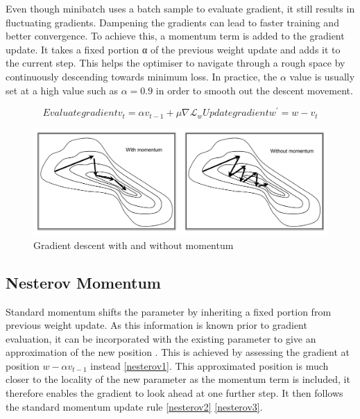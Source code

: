 \documentclass[11pt]{article} %
\theoremstyle{plain}
\theoremstyle{definition}
\begin{document}
\begin{appendices}
	Even though minibatch uses a batch sample to evaluate gradient, it still results in fluctuating gradients. Dampening the gradients can lead to faster training and better convergence. To achieve this, a momentum term is added to the gradient update. It takes a fixed portion α of the previous weight update and adds it to the current step. This helps the optimiser to navigate through a rough space by continuously descending towards minimum loss. In practice, the \(\alpha\) value is usually set at a high value such as \(\alpha=0.9\) in order to smooth out the descent movement.
	
	
	\begin{subequations} 
		
		Evaluate gradient
		\begin{equation}
		\label{momentum1}
		v_t=\alpha v_{t-1}+\mu \nabla \mathcal{L}_w
		\end{equation}
		
		Update gradient
		\begin{equation}
		\label{momentum2}
		w^\prime=w-v_t
		\end{equation}
		
	\end{subequations}
	
	\begin{figure}[H]
		\centering
		\includegraphics[width=1\textwidth]{momentum.PNG}
		\caption{Gradient descent with and without momentum}
		\label{fig:momentum}
	\end{figure}
	
	\subsection{Nesterov Momentum}
	
	Standard momentum shifts the parameter by inheriting a fixed portion from previous weight update. As this information is known prior to gradient evaluation, it can be incorporated with the existing parameter to give an approximation of the new position \cite{nesterov1983}. This is achieved by assessing the gradient at position \(w-\alpha v_{t-1}\) instead \eqref{nesterov1}. This approximated position is much closer to the locality of the new parameter as the momentum term is included, it therefore enables the gradient to look ahead at one further step. It then follows the standard momentum update rule \eqref{nesterov2} \eqref{nesterov3}.
	

\end{appendices}
\end{document}
